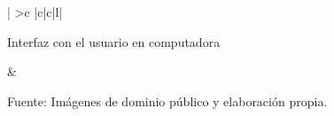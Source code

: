 \begin{landscape}
\begin{longtable}{|
			>{}c |c|c|l|}
{\begin{minipage}{\mymaxsizeofcontenttable}
			\begin{myflushcenter}
				{\footnotesize Interfaz con el usuario en computadora}
			\end{myflushcenter}
		\end{minipage}} &
		 \\ \hline
	\end{longtable}
	
	\begin{myflushleftlandscape}
		Fuente: Imágenes de dominio público y elaboración propia.
	\end{myflushleftlandscape}
	
	
	

\end{landscape}
